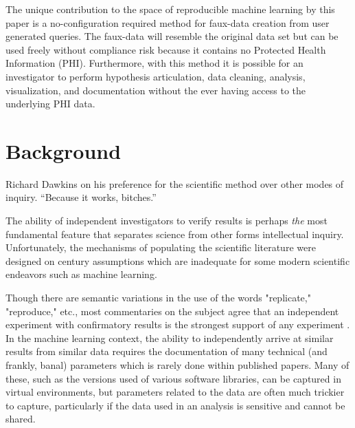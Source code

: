 \documentclass{article}
\begin{document}
The unique contribution to the space of reproducible machine learning by this paper is a no-configuration required method for faux-data creation from user generated queries. The faux-data will resemble the original data set but can be used freely without compliance risk because it contains no Protected Health Information (PHI). Furthermore, with this method it is possible for an investigator to perform hypothesis articulation, data cleaning, analysis, visualization, and documentation without the ever having access to the underlying PHI data.

\section{Background}

\begin{chapquote}{Richard Dawkins on his preference for the scientific method over other modes of inquiry.}
``Because it works, bitches.''
\end{chapquote}

The ability of independent investigators to verify results is perhaps \emph{the} most fundamental feature that separates science from other forms intellectual inquiry.  Unfortunately, the mechanisms of populating the scientific literature were designed on  century assumptions which are inadequate for some modern scientific endeavors such as machine learning.

Though there are semantic variations in the use of the words "replicate," "reproduce," etc., most commentaries on the subject agree that an independent experiment with confirmatory results is the strongest support of any experiment \cite{leek_opinion_2015, drummond_replicability_2009}.  In the machine learning context, the ability to independently arrive at similar results from similar data requires the documentation of many technical (and frankly, banal) parameters which is rarely done within published papers.  Many of these, such as the versions used of various software libraries, can be captured in virtual environments, but parameters related to the data are often much trickier to capture, particularly if the data used in an analysis is sensitive and cannot be shared.
\end{document}

